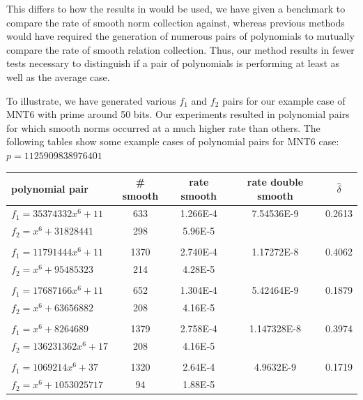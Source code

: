 \documentclass[a4paper, 10pt, envcountsect, runningheads]{lms}
\numberwithin{figure}{section}
\numberwithin{equation}{section}
\begin{document}
This differs to how the results in \cite{zajac} would be used, we have given a benchmark to compare the rate of smooth norm collection against, whereas previous methods would have required the generation of numerous pairs of polynomials to mutually compare the rate of smooth relation collection. Thus, our method results in fewer tests necessary to distinguish if a pair of polynomials is performing at least as well as the average case.

To illustrate, we have generated various $f_1$ and $f_2$ pairs for our example case of MNT6 with prime around 50 bits. Our experiments resulted in polynomial pairs for which smooth norms occurred at a much higher rate than others. The following tables show some example cases of polynomial pairs for MNT6 case:\\

$p=1125909838976401$
\begin{center}
\begin{tabular}{l|cccc}
polynomial pair & \# smooth & rate smooth & rate double smooth & $\hat{\delta}$\\
\hline
$f_1=35374332x^6+11$ &633&1.266E-4&7.54536E-9&0.2613\\
$f_2=x^6+31828441$ &298&5.96E-5&&\\
&&&&\\
$f_1=11791444x^6+11$ &1370&2.740E-4&1.17272E-8&0.4062\\
$f_2=x^6+95485323$ &214&4.28E-5&&\\
&&&&\\
$f_1=17687166x^6+11$ &652&1.304E-4&5.42464E-9&0.1879\\
$f_2=x^6+63656882$ &208&4.16E-5&&\\
&&&&\\
$f_1=x^6+8264689$ &1379&2.758E-4&1.147328E-8&0.3974\\
$f_2=136231362x^6+17$ &208&4.16E-5&&\\
&&&&\\
$f_1=1069214x^6+37$ &1320&2.64E-4&4.9632E-9&0.1719\\
$f_2=x^6+1053025717$ &94&1.88E-5&&
\end{tabular}
\end{center}
\vspace{0.5cm}
\end{document}
